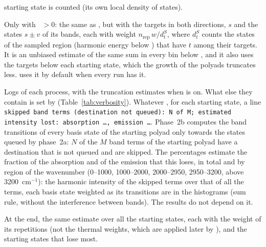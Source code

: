 \begin{description}
  starting state is counted (its own local density of states).
\item[\file{hist\_dos2}] Only with ~$>0$: the same as
  , but with the targets in both directions, $s$ and the
  states $s \pm v$ of its bands, each with weight $n_\mathrm{rep}\,w/d_t^S$,
  where $d_t^S$ counts the states of the sampled region (harmonic energy
  below ) that have $t$ among their targets. It is an
  unbiased estimate of the same sum in every bin below , and
  it also uses the targets below each starting state, which the growth of
  the polyads truncates less.  uses it by default
  when every run has it.
\item[\file{proclog\_n*}] Logs of each process, with the truncation
  estimates when  is on. What else they contain is set by
   (Table~\ref{tab:verbosity}). Whatever , for
  each starting state, a line \texttt{skipped band terms (destination not
  queued): N of M; estimated intensity lost: absorption \ldots, emission
  \ldots}. Phase~2b computes the band transitions of every basis state of
  the starting polyad only towards the states queued by phase~2a: $N$ of
  the $M$ band terms of the starting polyad have a destination that is
  not queued and are skipped. The percentages estimate the fraction of
  the absorption and of the emission that this loses, in total and by
  region of the wavenumber (0--1000, 1000--2000, 2000--2950, 2950--3200,
  above 3200~cm$^{-1}$): the harmonic intensity of the skipped terms over
  that of all the terms, each basis state weighted as its transitions are
  in the histograms (sum rule, without the interference between bands).
  The results do not depend on it.
\item[\file{masterlog}] At the end, the same estimate over all the
  starting states, each with the weight of its repetitions (not the
  thermal weights, which are applied later by ),
  and the starting states that lose most.
\end{description}
